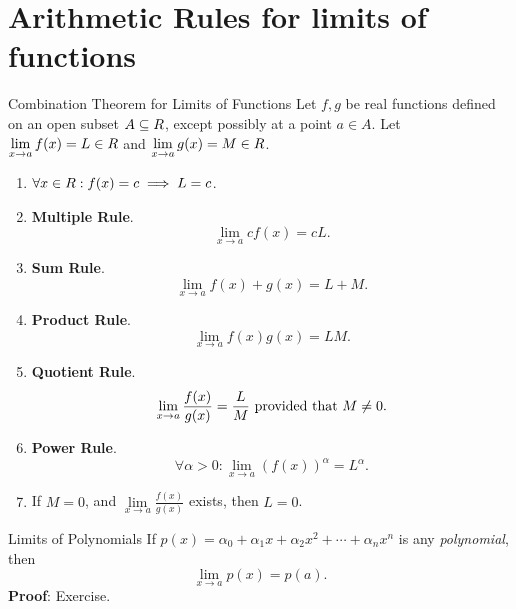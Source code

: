 \section{Arithmetic Rules for limits of functions}
\begin{Theorem}{Combination Theorem for Limits of Functions}{}
    Let $ f,g $ be real functions defined on an open subset $ A\subseteq \relax{R} $, except
    possibly at a point $ a\in A $. Let $ \lim\limits_{{x} \to {a}}f(x)=L\in\relax{R} $
    and $ \lim\limits_{{x} \to {a}}g(x)=M\in\relax{R} $.
    \begin{enumerate}[(1)]
        \item $ \forall x\in \relax{R}:f(x)=c \implies L=c $.
        \item \textbf{Multiple Rule}.
              \[ \displaystyle \lim\limits_{{x} \to {a}}c f(x)=cL. \]
        \item \textbf{Sum Rule}.
              \[ \lim\limits_{{x} \to {a}} f(x)+g(x)=L+M. \]
        \item \textbf{Product Rule}.
              \[ \lim\limits_{{x} \to {a}}f(x)g(x)=LM. \]
        \item \textbf{Quotient Rule}.
              \[ \lim\limits_{{x} \to {a}}\frac{f(x)}{g(x)}=\frac{L}{M}\text{ provided that $ M\ne 0 $}. \]
        \item \textbf{Power Rule}.
              \[ \forall \alpha>0:\lim\limits_{{x} \to {a}}(f(x))^\alpha=L^\alpha . \]
        \item If $ M=0 $, and $ \lim\limits_{{x} \to {a}}\frac{f(x)}{g(x)} $ exists, then $ L=0 $.
    \end{enumerate}
\end{Theorem}
\begin{Theorem}{Limits of Polynomials}{}
    If $ p(x)=\alpha_0+\alpha_1 x+\alpha_2 x^2+\cdots+\alpha_n x^n $ is any \emph{polynomial}, then
    \[ \lim\limits_{{x} \to {a}}p(x)=p(a). \]
    \tcblower{}
    \textbf{Proof}: Exercise.
\end{Theorem}
